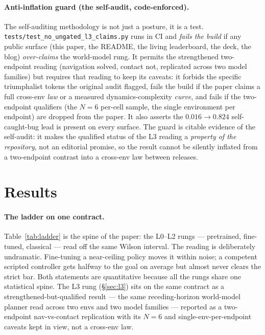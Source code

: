 \documentclass[10pt]{article}
\begin{document}
\paragraph{Anti-inflation guard (the self-audit, code-enforced).}
\label{sec:guard}
The self-auditing methodology is not just a posture, it is a test.
\texttt{tests/test\_no\_ungated\_l3\_claims.py} runs in CI and \emph{fails
the build} if any public surface (this paper, the README, the living
leaderboard, the deck, the blog) \emph{over-claims} the world-model rung.
It permits the strengthened two-endpoint reading (navigation solved,
contact not, replicated across two model families) but requires that
reading to keep its caveats: it forbids the specific triumphalist tokens
the original audit flagged, fails the build if the paper claims a full
cross-env \emph{law} or a measured dynamics-complexity \emph{curve}, and
fails if the two-endpoint qualifiers (the $N{=}6$ per-cell sample, the
single environment per endpoint) are dropped from the paper. It also
asserts the $0.016\to0.824$ self-caught-bug lead is present on every
surface. The guard is citable evidence of the self-audit: it makes the
qualified status of the L3 reading a \emph{property of the repository}, not
an editorial promise, so the result cannot be silently inflated from a
two-endpoint contrast into a cross-env law between releases.


\section{Results}
\label{sec:results}

\paragraph{The ladder on one contract.}
Table~\ref{tab:ladder} is the spine of the paper: the L0--L2
rungs --- pretrained, fine-tuned, classical --- read off the same Wilson
interval. The reading is deliberately undramatic. Fine-tuning a
near-ceiling policy moves it within noise; a competent scripted
controller gets halfway to the goal on average but almost never clears
the strict bar. Both statements are quantitative because all the rungs
share one statistical spine. The L3 rung (\S\ref{sec:l3}) sits on the
same contract as a strengthened-but-qualified result --- the same
receding-horizon world-model planner read across two envs and two model
families --- reported as a two-endpoint nav-vs-contact replication with its
$N{=}6$ and single-env-per-endpoint caveats kept in view, not a cross-env
law.
\end{document}
